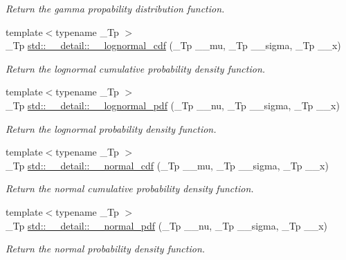 \begin{DoxyCompactItemize}
\begin{DoxyCompactList}\small\item\em Return the gamma propability distribution function. \end{DoxyCompactList}\item 
{\footnotesize template$<$typename \+\_\+\+Tp $>$ }\\\+\_\+\+Tp \hyperlink{namespacestd_1_1____detail_a871cf2e541cc4f8a79e4d219c628edc4}{std\+::\+\_\+\+\_\+detail\+::\+\_\+\+\_\+lognormal\+\_\+cdf} (\+\_\+\+Tp \+\_\+\+\_\+mu, \+\_\+\+Tp \+\_\+\+\_\+sigma, \+\_\+\+Tp \+\_\+\+\_\+x)
\begin{DoxyCompactList}\small\item\em Return the lognormal cumulative probability density function. \end{DoxyCompactList}\item 
{\footnotesize template$<$typename \+\_\+\+Tp $>$ }\\\+\_\+\+Tp \hyperlink{namespacestd_1_1____detail_a46c5dea7a38f38965bce5a84d389a02b}{std\+::\+\_\+\+\_\+detail\+::\+\_\+\+\_\+lognormal\+\_\+pdf} (\+\_\+\+Tp \+\_\+\+\_\+nu, \+\_\+\+Tp \+\_\+\+\_\+sigma, \+\_\+\+Tp \+\_\+\+\_\+x)
\begin{DoxyCompactList}\small\item\em Return the lognormal probability density function. \end{DoxyCompactList}\item 
{\footnotesize template$<$typename \+\_\+\+Tp $>$ }\\\+\_\+\+Tp \hyperlink{namespacestd_1_1____detail_a718b0f0884f0bc91b038ef4dabbb7427}{std\+::\+\_\+\+\_\+detail\+::\+\_\+\+\_\+normal\+\_\+cdf} (\+\_\+\+Tp \+\_\+\+\_\+mu, \+\_\+\+Tp \+\_\+\+\_\+sigma, \+\_\+\+Tp \+\_\+\+\_\+x)
\begin{DoxyCompactList}\small\item\em Return the normal cumulative probability density function. \end{DoxyCompactList}\item 
{\footnotesize template$<$typename \+\_\+\+Tp $>$ }\\\+\_\+\+Tp \hyperlink{namespacestd_1_1____detail_a622d27a8ea564d1299ebd5eb81a5fd21}{std\+::\+\_\+\+\_\+detail\+::\+\_\+\+\_\+normal\+\_\+pdf} (\+\_\+\+Tp \+\_\+\+\_\+nu, \+\_\+\+Tp \+\_\+\+\_\+sigma, \+\_\+\+Tp \+\_\+\+\_\+x)
\begin{DoxyCompactList}\small\item\em Return the normal probability density function. \end{DoxyCompactList}\item 

\end{DoxyCompactItemize}
